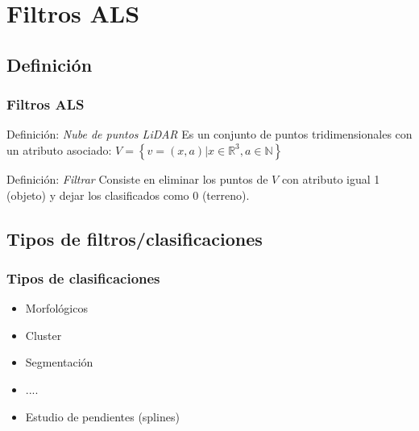 \section{Filtros ALS}
\subsection{Definición}
\begin{frame}[label=filter_def]
    \frametitle{Filtros ALS}
    \begin{beamerboxesrounded}[shadow=true]{Definición: \emph{Nube de puntos LiDAR}}
     Es un conjunto de puntos tridimensionales con un atributo asociado: $V = \left\lbrace v=\left(x,a\right) | x \in \mathbb{R}^3, a \in \mathbb{N} \right\rbrace$
    \end{beamerboxesrounded}


    \begin{beamerboxesrounded}[shadow=true]{Definición: \emph{Filtrar}}
     Consiste en \alert<4>{eliminar} los puntos de $V$ con atributo igual 1 (objeto) y dejar los clasificados como 0 (terreno).
    \end{beamerboxesrounded}
\end{frame}
\subsection{Tipos de filtros/clasificaciones}
\begin{frame}
    \frametitle{Tipos de clasificaciones}
    \begin{itemize}
        \item Morfológicos
        \item Cluster
        \item Segmentación
        \item ....
        \item Estudio de pendientes (splines)
    \end{itemize}
\end{frame}
